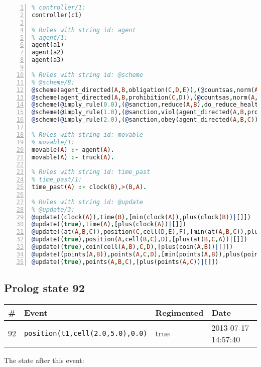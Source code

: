 \documentclass[11pt]{article}\usepackage[utf8]{inputenc}\usepackage{geometry}
\begin{document}
\begin{lstlisting}[language=Prolog, numbers=left]
% Rules with string id: controller
% controller/1:
controller(c1)

% Rules with string id: agent
% agent/1:
agent(a1)
agent(a2)
agent(a3)

% Rules with string id: @scheme
% @scheme/8:
@scheme(agent_directed(A,B,obligation(C,D,E)),(@countsas,norm(A,B,F,obligation(C,D,E)),F),false,(listTrue(C)),(time_past(D)),false,[plus(viol(agent_directed(A,B,obligation(C,D,E))))|[]],[plus(obey(agent_directed(A,B,obligation(C,D,E))))|[]])
@scheme(agent_directed(A,B,prohibition(C,D)),(@countsas,norm(A,B,E,prohibition(C,D)),E),(listTrue(C)),false,(false),false,[plus(viol(agent_directed(A,B,prohibition(C,D))))|[]],[plus(obey(agent_directed(A,B,prohibition(C,D))))|[]])
@scheme(@imply_rule(0.0),(@sanction,reduce(A,B),do_reduce_health(A,B),notifyAgent(A,changed(status))),true,false,false,false,[min(reduce(A,B))|[]],[])
@scheme(@imply_rule(1.0),(@sanction,viol(agent_directed(A,B,prohibition(C,D))),do_sanction(D)),true,false,false,false,[min(viol(agent_directed(A,B,prohibition(C,D))))|[]],[])
@scheme(@imply_rule(2.0),(@sanction,obey(agent_directed(A,B,C))),true,false,false,false,[min(obey(agent_directed(A,B,C)))|[]],[])

% Rules with string id: movable
% movable/1:
movable(A) :- agent(A).
movable(A) :- truck(A).

% Rules with string id: time_past
% time_past/1:
time_past(A) :- clock(B),>(B,A).

% Rules with string id: @update
% @update/3:
@update((clock(A)),time(B),[min(clock(A)),plus(clock(B))|[]])
@update((true),time(A),[plus(clock(A))|[]])
@update((at(A,B,C)),position(C,cell(D,E),F),[min(at(A,B,C)),plus(at(D,E,C))|[]])
@update((true),position(A,cell(B,C),D),[plus(at(B,C,A))|[]])
@update((true),coin(cell(A,B),C,D),[plus(coin(A,B))|[]])
@update((points(A,B)),points(A,C,D),[min(points(A,B)),plus(points(A,D))|[]])
@update((true),points(A,B,C),[plus(points(A,C))|[]])

\end{lstlisting}
\clearpage 
\subsection{Prolog state 92}
\begin{table}[ht]
\centering 
\begin{tabular}{l l l l} 
\textbf{\#} & \textbf{Event} & \textbf{Regimented} & \textbf{Date} \\ [0.5ex] 
\hline
92&\texttt{position(t1,cell(2.0,5.0),0.0)}&true&2013-07-17 14:57:40\\ [1ex] \hline\end{tabular}
\end{table}
The state after this event:
\end{document}
